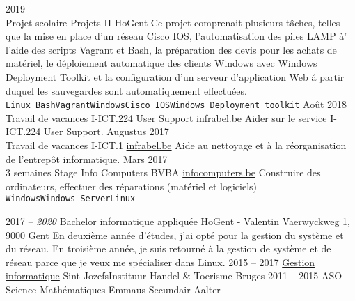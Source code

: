 \documentclass[9pt]{developercv} %
\begin{document}
\begin{entrylist}
	\entry
		{2019\\\footnotesize{Projet scolaire}}
		{Projets II}
		{HoGent}
		{Ce projet comprenait plusieurs t\^{a}ches, telles que la mise en place d'un r\'{e}seau Cisco IOS, l'automatisation des piles LAMP \`{a}' l'aide des scripts Vagrant et Bash, la pr\'{e}paration des devis pour les achats de mat\'{e}riel, le d\'{e}ploiement automatique des clients Windows avec Windows Deployment Toolkit et la configuration d'un serveur d'application Web \'{a} partir duquel les sauvegardes sont automatiquement effectu\'{e}es.
		\\ \texttt{Linux Bash}\slashsep\texttt{Vagrant}\slashsep\texttt{Windows}\slashsep\texttt{Cisco IOS}\slashsep\texttt{Windows Deployment toolkit}}
	\entry
	    {Ao\^{u}t 2018\\\footnotesize{Travail de vacances}}
	    {I-ICT.224 User Support}
	    {\href{https://www.infrabel.be/}{infrabel.be}}
	    {Aider sur le service I-ICT.224 User Support.}
	\entry
	    {Augustus 2017\\\footnotesize{Travail de vacances}}
	    {I-ICT.1}
	    {\href{https://www.infrabel.be/}{infrabel.be}}
	    {Aide au nettoyage et à la réorganisation de l'entrepôt informatique.}
	\entry
		{Mars 2017\\\footnotesize{3 semaines}}
		{Stage Info Computers BVBA}
		{\href{https://www.infocomputers.be/}{infocomputers.be}}
		{Construire des ordinateurs, effectuer des réparations (matériel et logiciels)\\
		\texttt{Windows}\slashsep\texttt{Windows Server}\slashsep\texttt{Linux}}
\end{entrylist}



\begin{entrylist}
	\entry
		{2017 -- \textit{2020}}
		{\href{https://www.hogent.be/opleidingen/bachelors/toegepaste-informatica/}{Bachelor informatique appliqu\'{e}e}}
		{HoGent - Valentin Vaerwyckweg 1, 9000 Gent}
		{En deuxi\`{e}me année d'\'{e}tudes, j'ai opt\'{e} pour la gestion du syst\`{e}me et du r\'{e}seau. En troisi\`{e}me ann\'{e}e, je suis retourn\'{e} \`{a} la gestion de syst\`{e}me et de r\'{e}seau parce que je veux me sp\'{e}cialiser dans Linux. }
	\entry
		{2015 -- 2017}
		{\href{https://www.sintjozefbrugge.be/5e-en-6e-netwerken-en-it/}{Gestion informatique}}
		{Sint-JozefsInstituur Handel \& Toerisme Bruges}
		{}
	\entry
		{2011 -- 2015}
		{ASO Science-Mathématiques}
		{Emmaus Secundair Aalter}
		{ }
\end{entrylist}
\end{document}
